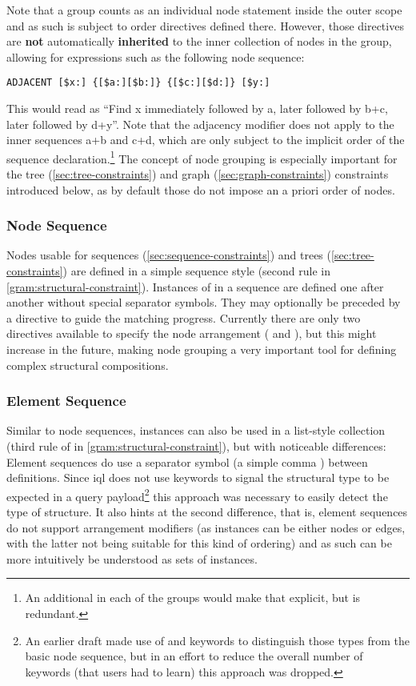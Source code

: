 \documentclass[11pt,a4paper]{report}
\begin{document}
Note that a group counts as an individual node statement inside the outer scope and as such is subject to order directives defined there.
However, those directives are \textbf{not} automatically \textbf{inherited} to the inner collection of nodes in the group, allowing for expressions such as the following node sequence:
\begin{Verbatim}[samepage=true]
ADJACENT [$x:] {[$a:][$b:]} {[$c:][$d:]} [$y:]
\end{Verbatim}
\noindent This would read as ``Find x immediately followed by a, later followed by b+c, later followed by d+y''.
Note that the adjacency modifier does not apply to the inner sequences a+b and c+d, which are only subject to the implicit order of the sequence declaration.\footnote{An additional  in each of the groups would make that explicit, but is redundant.}
The concept of node grouping is especially important for the tree (\ref{sec:tree-constraints}) and graph (\ref{sec:graph-constraints}) constraints introduced below, as by default those do not impose an a priori order of nodes.

\subsubsection{Node Sequence}
\label{sec:node-sequences}
\noindent Nodes usable for sequences (\ref{sec:sequence-constraints}) and trees (\ref{sec:tree-constraints}) are defined in a simple sequence style (second  rule in \cref{gram:structural-constraint}).
Instances of  in a sequence are defined one after another without special separator symbols.
They may optionally be preceded by a  directive to guide the matching progress.
Currently there are only two directives available to specify the node arrangement ( and ), but this might increase in the future, making node grouping a very important tool for defining complex structural compositions.

\subsubsection{Element Sequence}
\label{sec:element-sequence}
\noindent Similar to node sequences,  instances can also be used in a list-style collection (third rule of  in \cref{gram:structural-constraint}), but with noticeable differences: 
Element sequences do use a separator symbol (a simple comma \lit{,}) between  definitions.
Since \ac{iql} does not use keywords to signal the structural type to be expected in a query payload\footnote{An earlier draft made use of  and  keywords to distinguish those types from the basic node sequence, but in an effort to reduce the overall number of keywords (that users had to learn) this approach was dropped.} this approach was necessary to easily detect the type of structure.
It also hints at the second difference, that is, element sequences do not support arrangement modifiers (as  instances can be either nodes or edges, with the latter not being suitable for this kind of ordering) and as such can be more intuitively be understood as sets of  instances.
\end{document}
